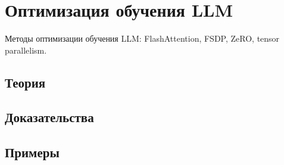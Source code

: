 
\section{Оптимизация обучения LLM}
\label{sec:2.5.06-llm-training-optimization}

\begin{ticket}
Методы оптимизации обучения LLM: FlashAttention, FSDP, ZeRO, tensor parallelism.
\end{ticket}

\subsection*{Теория}

\subsection*{Доказательства}

\subsection*{Примеры}
